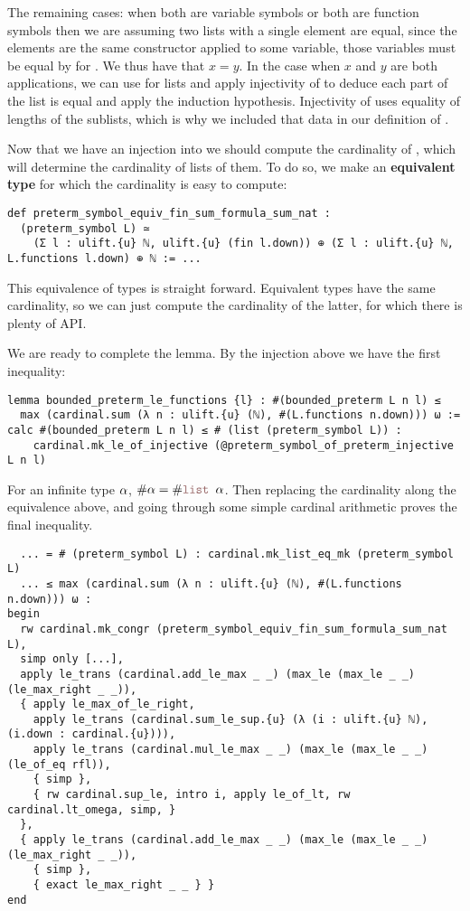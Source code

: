 The remaining cases: when both are variable symbols or both are function symbols
then we are assuming two lists with a single element are equal,
since the elements are the same constructor applied to some variable,
those variables must be equal by  for
.
We thus have that $x = y$.
In the case when $x$ and $y$ are both applications,
we can use  for lists and
apply injectivity of 
to deduce each part of the list is equal and apply the induction hypothesis.
Injectivity of  uses equality of lengths of the
sublists, which is why we included that data in our definition of
.

Now that we have an injection into 
we should compute the cardinality of ,
which will determine the cardinality of lists of them.
To do so, we make an \textbf{equivalent type} for which the cardinality
is easy to compute:

\begin{lstlisting}
def preterm_symbol_equiv_fin_sum_formula_sum_nat :
  (preterm_symbol L) ≃
    (Σ l : ulift.{u} ℕ, ulift.{u} (fin l.down)) ⊕ (Σ l : ulift.{u} ℕ, L.functions l.down) ⊕ ℕ := ... \end{lstlisting}

This equivalence of types is straight forward.
Equivalent types have the same cardinality, so
we can just compute the cardinality of the latter,
for which there is plenty of API.

We are ready to complete the lemma.
By the injection above we have the first inequality:
\begin{lstlisting}
lemma bounded_preterm_le_functions {l} : #(bounded_preterm L n l) ≤
  max (cardinal.sum (λ n : ulift.{u} (ℕ), #(L.functions n.down))) ω :=
calc #(bounded_preterm L n l) ≤ # (list (preterm_symbol L)) :
    cardinal.mk_le_of_injective (@preterm_symbol_of_preterm_injective L n l)
\end{lstlisting}
For an infinite type $\alpha$, $\# \al = \# \code{list } \al$.
Then replacing the cardinality along the equivalence above,
and going through some simple cardinal arithmetic proves the final inequality.
\begin{lstlisting}
  ... = # (preterm_symbol L) : cardinal.mk_list_eq_mk (preterm_symbol L)
  ... ≤ max (cardinal.sum (λ n : ulift.{u} (ℕ), #(L.functions n.down))) ω :
begin
  rw cardinal.mk_congr (preterm_symbol_equiv_fin_sum_formula_sum_nat L),
  simp only [...],
  apply le_trans (cardinal.add_le_max _ _) (max_le (max_le _ _) (le_max_right _ _)),
  { apply le_max_of_le_right,
    apply le_trans (cardinal.sum_le_sup.{u} (λ (i : ulift.{u} ℕ), (i.down : cardinal.{u}))),
    apply le_trans (cardinal.mul_le_max _ _) (max_le (max_le _ _) (le_of_eq rfl)),
    { simp },
    { rw cardinal.sup_le, intro i, apply le_of_lt, rw cardinal.lt_omega, simp, }
  },
  { apply le_trans (cardinal.add_le_max _ _) (max_le (max_le _ _) (le_max_right _ _)),
    { simp },
    { exact le_max_right _ _ } }
end \end{lstlisting}

